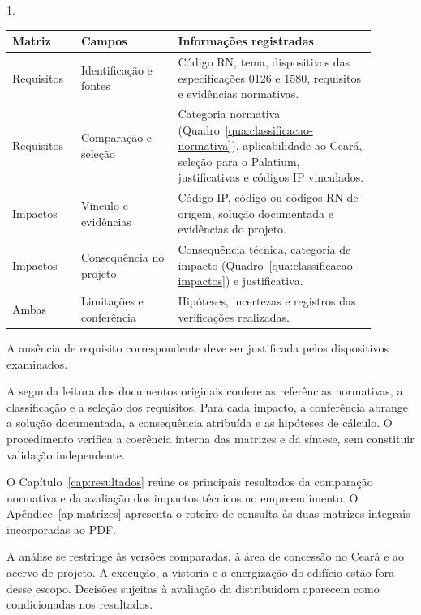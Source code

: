 \begin{quadro}[htbp]
  \centering
  \begin{Spacing}{1.}
    \caption{Estrutura das matrizes de requisitos e de impactos}
    \label{qua:campos-matriz}
  \end{Spacing}
  {\small
  \renewcommand{\arraystretch}{1.2}
  \setlength{\tabcolsep}{4pt}
  \begin{tabular}{|>{\raggedright\arraybackslash}p{0.16\linewidth}|>{\raggedright\arraybackslash}p{0.24\linewidth}|>{\raggedright\arraybackslash}p{0.49\linewidth}|}
    \hline
    \textbf{Matriz} & \textbf{Campos} & \textbf{Informações registradas} \\\hline
    Requisitos & Identificação e fontes & Código RN, tema, dispositivos das especificações 0126 e 1580, requisitos e evidências normativas. \\\hline
    Requisitos & Comparação e seleção & Categoria normativa (Quadro~\ref{qua:classificacao-normativa}), aplicabilidade ao Ceará, seleção para o Palatium, justificativas e códigos IP vinculados. \\\hline
    Impactos & Vínculo e evidências & Código IP, código ou códigos RN de origem, solução documentada e evidências do projeto. \\\hline
    Impactos & Consequência no projeto & Consequência técnica, categoria de impacto (Quadro~\ref{qua:classificacao-impactos}) e justificativa. \\\hline
    Ambas & Limitações e conferência & Hipóteses, incertezas e registros das verificações realizadas. \\\hline
  \end{tabular}}
\end{quadro}

A ausência de requisito correspondente deve ser justificada pelos dispositivos examinados.

A segunda leitura dos documentos originais confere as referências normativas, a classificação e a seleção dos requisitos. Para cada impacto, a conferência abrange a solução documentada, a consequência atribuída e as hipóteses de cálculo. O procedimento verifica a coerência interna das matrizes e da síntese, sem constituir validação independente.

O Capítulo~\ref{cap:resultados} reúne os principais resultados da comparação normativa e da avaliação dos impactos técnicos no empreendimento. O Apêndice~\ref{ap:matrizes} apresenta o roteiro de consulta às duas matrizes integrais incorporadas ao PDF.

A análise se restringe às versões comparadas, à área de concessão no Ceará e ao acervo de projeto. A execução, a vistoria e a energização do edifício estão fora desse escopo. Decisões sujeitas à avaliação da distribuidora aparecem como condicionadas nos resultados.


